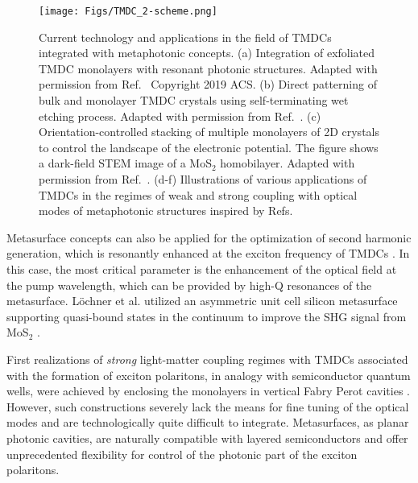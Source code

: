 \documentclass[journal=chreay,manuscript=review]{achemso}
\begin{document}
\begin{figure}
    \centering
    \texttt{[image: Figs/TMDC\_2-scheme.png]}
    \caption{
    Current technology and applications in the field of TMDCs integrated with metaphotonic concepts. (a) Integration of exfoliated TMDC monolayers with resonant photonic structures. Adapted with permission from Ref.~ Copyright 2019 ACS. (b) Direct patterning of bulk and monolayer TMDC crystals using self-terminating wet etching process. Adapted with permission from Ref.~. (c) Orientation-controlled stacking of multiple monolayers of 2D crystals to control the landscape of the electronic potential. The figure shows a dark-field STEM image of a MoS$_2$ homobilayer. Adapted with permission from Ref.~. (d-f) Illustrations of various applications of TMDCs in the regimes of weak and strong coupling with optical modes of metaphotonic structures inspired by Refs.~}
    \label{fig:TMDC2scheme}
\end{figure}

Metasurface concepts can also be applied for the optimization of second harmonic generation, which is resonantly enhanced at the exciton frequency of TMDCs \cite{malard2013observation}. In this case, the most critical parameter is the enhancement of the optical field at the pump wavelength, which can be provided by high-Q resonances of the metasurface. L{\"o}chner et al. utilized an asymmetric unit cell silicon metasurface supporting quasi-bound states in the continuum to improve the SHG signal from MoS$_2$ \cite{loechner2020hybrid}.

First realizations of \textit{strong} light-matter coupling regimes with TMDCs associated with the formation of exciton polaritons, in analogy with semiconductor quantum wells, were achieved by enclosing the monolayers in vertical Fabry Perot cavities \cite{liu2015strong}. However, such constructions severely lack the means for fine tuning of the optical modes and are technologically quite difficult to integrate. Metasurfaces, as planar photonic cavities, are naturally compatible with layered semiconductors and offer unprecedented flexibility for control of the photonic part of the exciton polaritons. 
\end{document}
